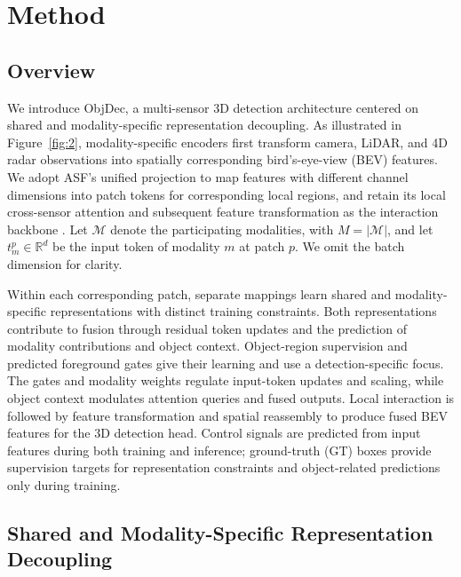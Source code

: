 
\section{Method}\label{sec:methods}

\subsection{Overview}
\label{subsec:31}

We introduce ObjDec, a multi-sensor 3D detection architecture centered on shared and modality-specific representation decoupling. As illustrated in Figure~\ref{fig:2}, modality-specific encoders first transform camera, LiDAR, and 4D radar observations into spatially corresponding bird's-eye-view (BEV) features. We adopt ASF's unified projection to map features with different channel dimensions into patch tokens for corresponding local regions, and retain its local cross-sensor attention and subsequent feature transformation as the interaction backbone \citep{paek2025asf}. Let \(\mathcal M\) denote the participating modalities, with \(M=|\mathcal M|\), and let \(t_m^p\in\mathbb R^d\) be the input token of modality \(m\) at patch \(p\). We omit the batch dimension for clarity.

Within each corresponding patch, separate mappings learn shared and modality-specific representations with distinct training constraints. Both representations contribute to fusion through residual token updates and the prediction of modality contributions and object context. Object-region supervision and predicted foreground gates give their learning and use a detection-specific focus. The gates and modality weights regulate input-token updates and scaling, while object context modulates attention queries and fused outputs. Local interaction is followed by feature transformation and spatial reassembly to produce fused BEV features for the 3D detection head. Control signals are predicted from input features during both training and inference; ground-truth (GT) boxes provide supervision targets for representation constraints and object-related predictions only during training.


\subsection{Shared and Modality-Specific Representation Decoupling}
\label{subsec:32}

